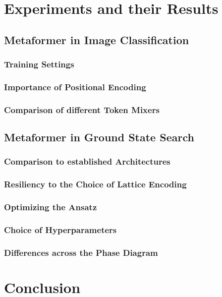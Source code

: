 \documentclass[
headings=optiontohead,              %
12pt,                               %
DIV=13,                             %
twoside=false,                      %
open=right,                         %
BCOR=10mm,                          %
toc=bibliographynumbered            %
]{scrreport}
\begin{document}
\chapter{Experiments and their Results}
    \section{Metaformer in Image Classification}
        \subsection{Training Settings}
        \label{sec:experiments-trainingsettings}

        \subsection{Importance of Positional Encoding}
        \label{sec:experiments-positionalencoding}
        \subsection{Comparison of different Token Mixers}
        \label{sec:experiments-tokenmixers}

    \section{Metaformer in Ground State Search}
        \subsection{Comparison to established Architectures}
        \label{sec:experiments-comparisontoestablished}
        \subsection{Resiliency to the Choice of Lattice Encoding}
        \label{sec:experiments-resiliencylatticeencoding}
        \subsection{Optimizing the Ansatz}
        \label{sec:experiments-optimizingtheansatz}
        \subsection{Choice of Hyperparameters}
        \label{sec:experiments-hyperparameters}
        \subsection{Differences across the Phase Diagram}
        \label{sec:experiments-phasecriticalpoint}

\chapter{Conclusion}
\label{sec:conclusion}



\end{document}
